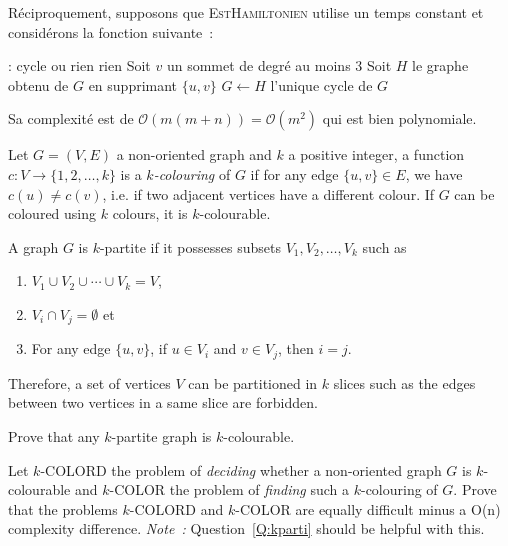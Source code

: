 \documentclass[12pt,addpoints]{exam}
\newcommand{\bigo}{\mathcal{O}}
\begin{document}
\begin{questions}
\begin{solution}
Réciproquement, supposons que \textsc{EstHamiltonien} utilise un temps constant et considérons la fonction suivante~:
\begin{algorithmic}[1]
   : cycle ou rien
      \State \Return rien
    \Else
        \State Soit $v$ un sommet de degré au moins $3$
          \State Soit $H$ le graphe obtenu de $G$ en supprimant $\{u,v\}$
            \State $G \leftarrow H$
          \EndIf
        \EndFor
      \EndWhile
      \State \Return l'unique cycle de $G$
    \EndIf
  \EndFunction
\end{algorithmic}
Sa complexité est de $\bigo(m(m + n)) = \bigo(m^2)$ qui est bien polynomiale.
\end{solution}

\question\label{Q:kparti}
Let $G = (V,E)$ a non-oriented graph and $k$ a positive integer, a function $c : V \rightarrow \{1,2,\ldots,k\}$ is a \emph{$k$-colouring} of $G$ if for any edge $\{u,v\} \in E$, we have $c(u) \neq c(v)$, i.e. if two adjacent vertices have a different colour. If $G$ can be coloured using $k$ colours, it is $k$-colourable.

A graph $G$ is $k$-partite if it possesses subsets $V_1, V_2, \ldots, V_k$ such as
\begin{enumerate}
  \item $V_1 \cup V_2 \cup \cdots \cup V_k = V$,
  \item $V_i \cap V_j = \emptyset$ et
  \item For any edge $\{u,v\}$, if $u \in V_i$ and $v \in V_j$, then $i = j$.
\end{enumerate}
Therefore, a set of vertices $V$ can be partitioned in $k$ slices such as the edges between two vertices in a same slice are forbidden.

Prove that any $k$-partite graph is $k$-colourable.

\question
Let $k$-COLORD the problem of \emph{deciding} whether a non-oriented graph $G$ is $k$-colourable and $k$-COLOR the problem of \emph{finding} such a $k$-colouring of $G$.
Prove that the problems $k$-COLORD and $k$-COLOR are equally difficult minus a O(n) complexity difference. \emph{Note~:} Question~\ref{Q:kparti} should be helpful with this.



\end{questions}
\end{document}
